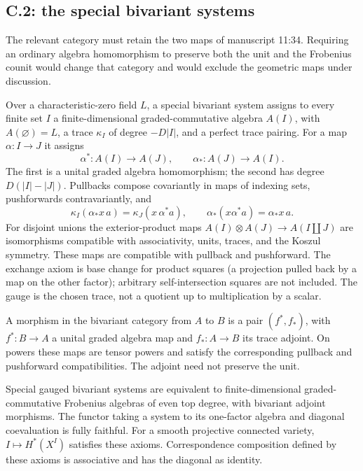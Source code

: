 \subsection{C.2: the special bivariant systems}

The relevant category must retain the two maps of manuscript 11:34. Requiring an ordinary algebra homomorphism to preserve both the unit and the Frobenius counit would change that category and would exclude the geometric maps under discussion.

\begin{definition}
\label{c:bivariant-def}
Over a characteristic-zero field $L$, a special bivariant system assigns to every finite set $I$ a finite-dimensional graded-commutative algebra $A(I)$, with $A(\varnothing)=L$, a trace $\kappa_I$ of degree $-D|I|$, and a perfect trace pairing. For a map $\alpha:I\to J$ it assigns
\[
 \alpha^*:A(I)\longrightarrow A(J),\qquad
 \alpha_*:A(J)\longrightarrow A(I).
\]
The first is a unital graded algebra homomorphism; the second has degree $D(|I|-|J|)$. Pullbacks compose covariantly in maps of indexing sets, pushforwards contravariantly, and
\[
 \kappa_I(\alpha_*x\,a)=\kappa_J(x\,\alpha^*a),\qquad
 \alpha_*(x\alpha^*a)=\alpha_*x\,a.
\]
For disjoint unions the exterior-product maps $A(I)\otimes A(J)\to A(I\amalg J)$ are isomorphisms compatible with associativity, units, traces, and the Koszul symmetry. These maps are compatible with pullback and pushforward. The exchange axiom is base change for product squares (a projection pulled back by a map on the other factor); arbitrary self-intersection squares are not included. The gauge is the chosen trace, not a quotient up to multiplication by a scalar.

A morphism in the bivariant category from $A$ to $B$ is a pair $(f^*,f_*)$, with $f^*:B\to A$ a unital graded algebra map and $f_*:A\to B$ its trace adjoint. On powers these maps are tensor powers and satisfy the corresponding pullback and pushforward compatibilities. The adjoint need not preserve the unit.
\end{definition}

\begin{theorem}
\label{c:bivariant-equivalence}
Special gauged bivariant systems are equivalent to finite-dimensional graded-commutative Frobenius algebras of even top degree, with bivariant adjoint morphisms. The functor taking a system to its one-factor algebra and diagonal coevaluation is fully faithful. For a smooth projective connected variety, $I\mapsto H^*(X^I)$ satisfies these axioms. Correspondence composition defined by these axioms is associative and has the diagonal as identity.
\end{theorem}


